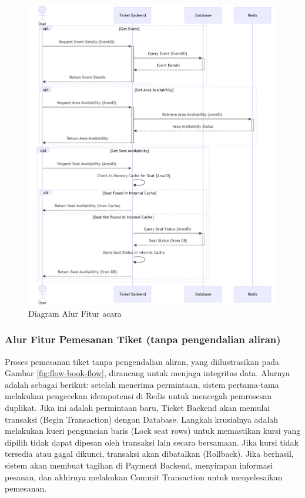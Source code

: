 \begin{figure}[H]
    \centering
    \includegraphics[width=1\textwidth]{resources/chapter-3/event-flow.png}
    \caption{Diagram Alur Fitur acara}
    \label{fig:flow-event}
\end{figure}

\pagebreak

\subsubsection{Alur Fitur Pemesanan Tiket (tanpa pengendalian aliran)}

Proses pemesanan tiket tanpa pengendalian aliran, yang diilustrasikan pada Gambar \ref{fig:flow-book-flow}, dirancang untuk menjaga integritas data. Alurnya adalah sebagai berikut: setelah menerima permintaan, sistem pertama-tama melakukan pengecekan idempotensi di Redis untuk mencegah pemrosesan duplikat. Jika ini adalah permintaan baru, Ticket Backend akan memulai transaksi (Begin Transaction) dengan Database. Langkah krusialnya adalah melakukan kueri penguncian baris (Lock seat rows) untuk memastikan kursi yang dipilih tidak dapat dipesan oleh transaksi lain secara bersamaan. Jika kursi tidak tersedia atau gagal dikunci, transaksi akan dibatalkan (Rollback). Jika berhasil, sistem akan membuat tagihan di Payment Backend, menyimpan informasi pesanan, dan akhirnya melakukan Commit Transaction untuk menyelesaikan pemesanan.

